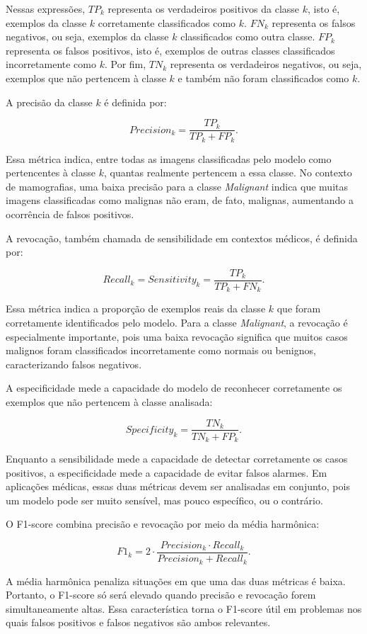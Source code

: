 \documentclass[
    12pt,
    openright,
    oneside,
    a4paper,
    english,
    brazil
]{abntex2}
\begin{document}
Nessas expressões, \(TP_k\) representa os verdadeiros positivos da classe \(k\), isto é, exemplos da classe \(k\) corretamente classificados como \(k\). \(FN_k\) representa os falsos negativos, ou seja, exemplos da classe \(k\) classificados como outra classe. \(FP_k\) representa os falsos positivos, isto é, exemplos de outras classes classificados incorretamente como \(k\). Por fim, \(TN_k\) representa os verdadeiros negativos, ou seja, exemplos que não pertencem à classe \(k\) e também não foram classificados como \(k\).

A precisão da classe \(k\) é definida por:

\[
Precision_k =
\frac{TP_k}{TP_k + FP_k}.
\]

Essa métrica indica, entre todas as imagens classificadas pelo modelo como pertencentes à classe \(k\), quantas realmente pertencem a essa classe. No contexto de mamografias, uma baixa precisão para a classe \textit{Malignant} indica que muitas imagens classificadas como malignas não eram, de fato, malignas, aumentando a ocorrência de falsos positivos.

A revocação, também chamada de sensibilidade em contextos médicos, é definida por:

\[
Recall_k = Sensitivity_k =
\frac{TP_k}{TP_k + FN_k}.
\]

Essa métrica indica a proporção de exemplos reais da classe \(k\) que foram corretamente identificados pelo modelo. Para a classe \textit{Malignant}, a revocação é especialmente importante, pois uma baixa revocação significa que muitos casos malignos foram classificados incorretamente como normais ou benignos, caracterizando falsos negativos.

A especificidade mede a capacidade do modelo de reconhecer corretamente os exemplos que não pertencem à classe analisada:

\[
Specificity_k =
\frac{TN_k}{TN_k + FP_k}.
\]

Enquanto a sensibilidade mede a capacidade de detectar corretamente os casos positivos, a especificidade mede a capacidade de evitar falsos alarmes. Em aplicações médicas, essas duas métricas devem ser analisadas em conjunto, pois um modelo pode ser muito sensível, mas pouco específico, ou o contrário.

O F1-score combina precisão e revocação por meio da média harmônica:

\[
F1_k =
2 \cdot
\frac{Precision_k \cdot Recall_k}
{Precision_k + Recall_k}.
\]

A média harmônica penaliza situações em que uma das duas métricas é baixa. Portanto, o F1-score só será elevado quando precisão e revocação forem simultaneamente altas. Essa característica torna o F1-score útil em problemas nos quais falsos positivos e falsos negativos são ambos relevantes.
\end{document}
